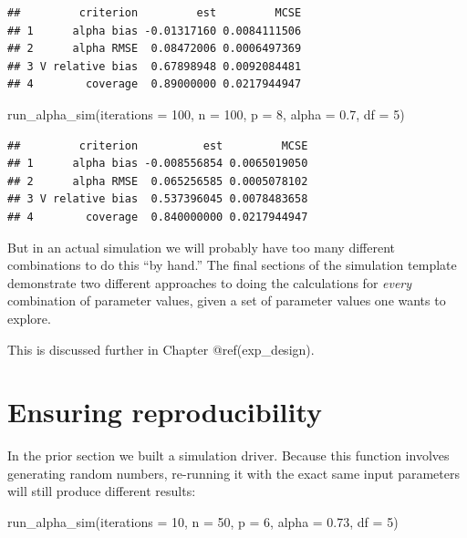 \documentclass[
]{book}
\newenvironment{Shaded}{\begin{snugshade}}{\end{snugshade}}
\newcommand{\AttributeTok}[1]{\textcolor[rgb]{0.77,0.63,0.00}{#1}}
\newcommand{\DecValTok}[1]{\textcolor[rgb]{0.00,0.00,0.81}{#1}}
\newcommand{\FloatTok}[1]{\textcolor[rgb]{0.00,0.00,0.81}{#1}}
\newcommand{\FunctionTok}[1]{\textcolor[rgb]{0.00,0.00,0.00}{#1}}
\newcommand{\NormalTok}[1]{#1}
\begin{document}
\begin{verbatim}
##         criterion         est         MCSE
## 1      alpha bias -0.01317160 0.0084111506
## 2      alpha RMSE  0.08472006 0.0006497369
## 3 V relative bias  0.67898948 0.0092084481
## 4        coverage  0.89000000 0.0217944947
\end{verbatim}

\begin{Shaded}
\begin{Highlighting}[]
\FunctionTok{run\_alpha\_sim}\NormalTok{(}\AttributeTok{iterations =} \DecValTok{100}\NormalTok{, }\AttributeTok{n =} \DecValTok{100}\NormalTok{, }\AttributeTok{p =} \DecValTok{8}\NormalTok{, }\AttributeTok{alpha =} \FloatTok{0.7}\NormalTok{, }\AttributeTok{df =} \DecValTok{5}\NormalTok{)}
\end{Highlighting}
\end{Shaded}

\begin{verbatim}
##         criterion          est         MCSE
## 1      alpha bias -0.008556854 0.0065019050
## 2      alpha RMSE  0.065256585 0.0005078102
## 3 V relative bias  0.537396045 0.0078483658
## 4        coverage  0.840000000 0.0217944947
\end{verbatim}

But in an actual simulation we will probably have too many different combinations to do this ``by hand.''
The final sections of the simulation template demonstrate two different approaches to doing the calculations for \emph{every} combination of parameter values, given a set of parameter values one wants to explore.

This is discussed further in Chapter @ref(exp\_design).

\hypertarget{ensuring-reproducibility}{%
\chapter{Ensuring reproducibility}\label{ensuring-reproducibility}}

In the prior section we built a simulation driver.
Because this function involves generating random numbers, re-running it with the exact same input parameters will still produce different results:

\begin{Shaded}
\begin{Highlighting}[]
\FunctionTok{run\_alpha\_sim}\NormalTok{(}\AttributeTok{iterations =} \DecValTok{10}\NormalTok{, }\AttributeTok{n =} \DecValTok{50}\NormalTok{, }\AttributeTok{p =} \DecValTok{6}\NormalTok{, }\AttributeTok{alpha =} \FloatTok{0.73}\NormalTok{, }\AttributeTok{df =} \DecValTok{5}\NormalTok{)}
\end{Highlighting}
\end{Shaded}
\end{document}
